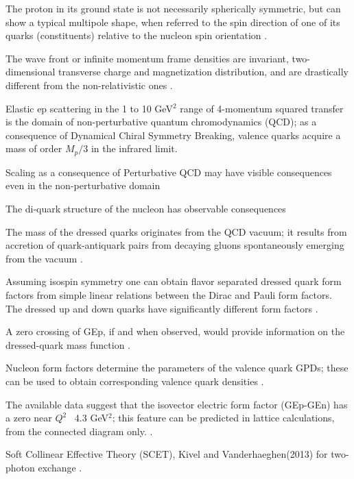 The proton in its ground state is not necessarily spherically symmetric, but can show a typical multipole shape, 
when referred to the spin direction of one of its quarks (constituents) relative to the nucleon spin orientation
 \cite{miller:2003}. %

The wave front or infinite momentum frame densities are invariant, two-dimensional transverse charge and magnetization distribution, 
and are drastically different
from the non-relativistic ones \cite{miller:2003,carlson:2007}. %

Elastic ep scattering in the 1 to 10 GeV$^2$ range of 4-momentum squared transfer is
the domain of non-perturbative quantum chromodynamics (QCD); as a consequence of Dynamical Chiral Symmetry
Breaking, valence quarks acquire a mass of order $M_p/3$ in the infrared limit. \cite{cloet:2008b,cloet:2008}

   Scaling as a consequence of Perturbative QCD may have visible consequences even in the non-perturbative
 domain \cite{Galynskii:2013} 

The di-quark structure of the nucleon has observable consequences \cite{cloet:2012cy}

The mass of the dressed quarks originates from the QCD vacuum; it results
from accretion of quark-antiquark pairs from decaying gluons spontaneously emerging from the vacuum \cite{cloet:2008}. 

Assuming isospin symmetry one can obtain flavor separated dressed quark form
factors from simple linear relations between the Dirac and Pauli form factors.
The dressed up and down quarks have significantly different form factors 
\cite{cloet:2008,cates:2011,rohrmoser:2011,wilson:2011,Cloet:2013gva,qattan:2013}. 

A zero crossing of GEp, if and when observed,  would provide information on the dressed-quark mass
function \cite{diehl:2013}.

Nucleon form factors determine the parameters of the valence quark GPDs;
these can be used to obtain corresponding valence quark densities \cite{diehl:2013}.

The available data suggest that the isovector electric form factor (GEp-GEn) has a zero near $Q^2$~ 4.3 GeV$^2$;
this feature can be predicted in lattice calculations, from the connected diagram only. \cite{diehl:2013}.
 
Soft  Collinear Effective Theory (SCET), Kivel and Vanderhaeghen(2013)
for two-photon exchange \cite{kivel:2012}.


